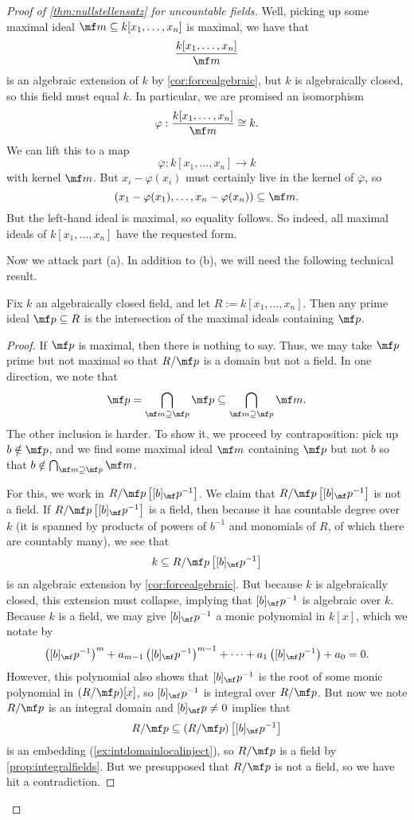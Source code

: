 \documentclass[../notes.tex]{subfiles}
\begin{document}
\begin{proof}[Proof of \autoref{thm:nullstellensatz} for uncountable fields]
	Well, picking up some maximal ideal $\mf m\subseteq k[x_1,\ldots,x_n]$ is maximal, we have that
	\[\frac{k[x_1,\ldots,x_n]}{\mf m}\]
	is an algebraic extension of $k$ by \autoref{cor:forcealgebraic}, but $k$ is algebraically closed, so this field must equal $k$. In particular, we are promised an isomorphism
	\[\varphi:\frac{k[x_1,\ldots,x_n]}{\mf m}\cong k.\]
	We can lift this to a map
	\[\overline\varphi:k[x_1,\ldots,x_n]\to k\]
	with kernel $\mf m$. But $x_i-\varphi(x_i)$ must certainly live in the kernel of $\overline\varphi$, so
	\[(x_1-\varphi(x_1),\ldots,x_n-\varphi(x_n))\subseteq\mf m.\]
	But the left-hand ideal is maximal, so equality follows. So indeed, all maximal ideals of $k[x_1,\ldots,x_n]$ have the requested form.

	Now we attack part (a). In addition to (b), we will need the following technical result.
	\begin{lemma} \label{lem:betterjacobson}
		Fix $k$ an algebraically closed field, and let $R:=k[x_1,\ldots,x_n]$. Then any prime ideal $\mf p\subseteq R$ is the intersection of the maximal ideals containing $\mf p$.
	\end{lemma}
	\begin{proof}
		If $\mf p$ is maximal, then there is nothing to say. Thus, we may take $\mf p$ prime but not maximal so that $R/\mf p$ is a domain but not a field. In one direction, we note that
		\[\mf p=\bigcap_{\mf m\supseteq\mf p}\mf p\subseteq\bigcap_{\mf m\supseteq\mf p}\mf m.\]
		The other inclusion is harder. To show it, we proceed by contraposition: pick up $b\notin\mf p$, and we find some maximal ideal $\mf m$ containing $\mf p$ but not $b$ so that $b\notin\bigcap_{\mf m\supseteq\mf p}\mf m$.

		For this, we work in $R/\mf p\left[[b]_\mf p^{-1}\right]$. We claim that $R/\mf p\left[[b]_\mf p^{-1}\right]$ is not a field. If $R/\mf p\left[[b]_\mf p^{-1}\right]$ is a field, then because it has countable degree over $k$ (it is spanned by products of powers of $b^{-1}$ and monomials of $R$, of which there are countably many), we see that
		\[k\subseteq R/\mf p\left[[b]_\mf p^{-1}\right]\]
		is an algebraic extension by \autoref{cor:forcealgebraic}. But because $k$ is algebraically closed, this extension must collapse, implying that $[b]_\mf p^{-1}$ is algebraic over $k$. Because $k$ is a field, we may give $[b]_\mf p^{-1}$ a monic polynomial in $k[x]$, which we notate by
		\[\left([b]_\mf p^{-1}\right)^m+a_{m-1}\left([b]_\mf p^{-1}\right)^{m-1}+\cdots+a_1\left([b]_\mf p^{-1}\right)+a_0=0.\]
		However, this polynomial also shows that $[b]_\mf p^{-1}$ is the root of some monic polynomial in $(R/\mf p)[x]$, so $[b]_\mf p^{-1}$ is integral over $R/\mf p$. But now we note $R/\mf p$ is an integral domain and $[b]_\mf p\ne0$ implies that
		\[R/\mf p\subseteq(R/\mf p)\left[[b]_\mf p^{-1}\right]\]
		is an embedding (\autoref{ex:intdomainlocalinject}), so $R/\mf p$ is a field by \autoref{prop:integralfields}. But we presupposed that $R/\mf p$ is not a field, so we have hit a contradiction.


\end{proof}
\end{proof}
\end{document}
